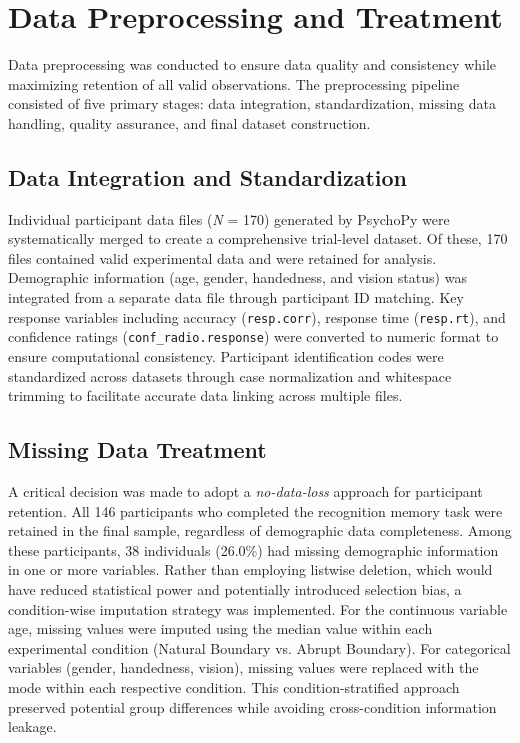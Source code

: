 \section{Data Preprocessing and Treatment}

Data preprocessing was conducted to ensure data quality and consistency while maximizing retention of all valid observations. The preprocessing pipeline consisted of five primary stages: data integration, standardization, missing data handling, quality assurance, and final dataset construction.

\subsection{Data Integration and Standardization}

Individual participant data files (\textit{N} = 170) generated by PsychoPy were systematically merged to create a comprehensive trial-level dataset. Of these, 170 files contained valid experimental data and were retained for analysis. Demographic information (age, gender, handedness, and vision status) was integrated from a separate data file through participant ID matching. Key response variables including accuracy (\texttt{resp.corr}), response time (\texttt{resp.rt}), and confidence ratings (\texttt{conf\_radio.response}) were converted to numeric format to ensure computational consistency. Participant identification codes were standardized across datasets through case normalization and whitespace trimming to facilitate accurate data linking across multiple files.

\subsection{Missing Data Treatment}

A critical decision was made to adopt a \textit{no-data-loss} approach for participant retention. All 146 participants who completed the recognition memory task were retained in the final sample, regardless of demographic data completeness. Among these participants, 38 individuals (26.0\%) had missing demographic information in one or more variables. Rather than employing listwise deletion, which would have reduced statistical power and potentially introduced selection bias, a condition-wise imputation strategy was implemented. For the continuous variable age, missing values were imputed using the median value within each experimental condition (Natural Boundary vs. Abrupt Boundary). For categorical variables (gender, handedness, vision), missing values were replaced with the mode within each respective condition. This condition-stratified approach preserved potential group differences while avoiding cross-condition information leakage.

